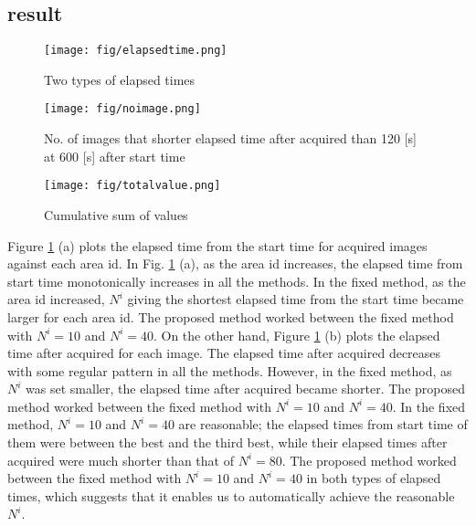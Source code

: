 \documentclass{ieeeaccess}
\begin{document}
\subsection{result}

\begin{figure}[t]
\begin{center}
\texttt{[image: fig/elapsedtime.png]}
\caption{Two types of elapsed times}
\label{elapsed}
\end{center}
\end{figure}

\begin{figure*}[t]
\begin{center}
\texttt{[image: fig/noimage.png]}
\caption{No. of images that shorter elapsed time after acquired than 120 [s] at 600 [s] after start time}
\label{totalnumber}
\end{center}
\end{figure*}

\begin{figure*}[t]
\begin{center}
\texttt{[image: fig/totalvalue.png]}
\caption{Cumulative sum of values}
\label{totalvalue}
\end{center}
\end{figure*}

Figure \ref{elapsed} (a) plots the elapsed time from the start time for acquired images against each area id.
In Fig. \ref{elapsed} (a), as the area id increases, the elapsed time from start time monotonically increases in all the methods.
In the fixed method, as the area id increased, $N^i$ giving the shortest elapsed time from the start time became larger for each area id.
The proposed method worked between the fixed method with $N^i=10$ and $N^i=40$.
%
On the other hand, Figure \ref{elapsed} (b) plots the elapsed time after acquired for each image.
The elapsed time after acquired decreases with some regular pattern in all the methods.
However, in the fixed method, as $N^i$ was set smaller, the elapsed time after acquired became shorter.
The proposed method worked between the fixed method with $N^i=10$ and $N^i=40$.
%
In the fixed method, $N^i=10$ and $N^i=40$ are reasonable; the elapsed times from start time of them were between the best and the third best, while their elapsed times after acquired were much shorter than that of $N^i=80$.
%
The proposed method worked between the fixed method with $N^i=10$ and $N^i=40$ in both types of elapsed times, which suggests that it enables us to automatically achieve the reasonable $N^i$.
\end{document}
